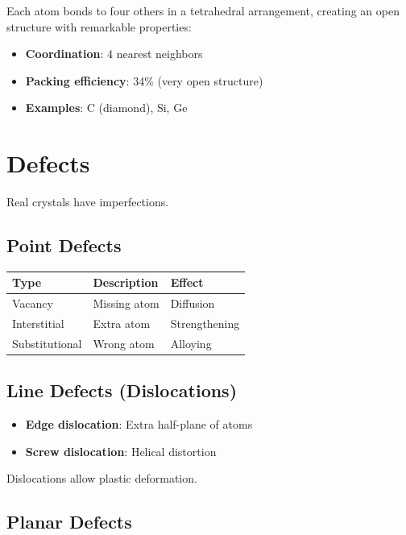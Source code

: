 \documentclass[
  11pt,
  letterpaper,
  twoside,
  openright]{book}
\providecommand{\tightlist}{%
  \setlength{\itemsep}{0pt}\setlength{\parskip}{0pt}}
\begin{document}
Each atom bonds to four others in a tetrahedral arrangement, creating an
open structure with remarkable properties:

\begin{itemize}
\tightlist
\item
  \textbf{Coordination}: 4 nearest neighbors
\item
  \textbf{Packing efficiency}: 34\% (very open structure)
\item
  \textbf{Examples}: C (diamond), Si, Ge
\end{itemize}

\section{Defects}\label{defects}

Real crystals have imperfections.

\subsection{Point Defects}\label{point-defects}

\begin{longtable}[]{@{}lll@{}}
\toprule\noalign{}
Type & Description & Effect \\
\midrule\noalign{}
\endhead
\bottomrule\noalign{}
\endlastfoot
Vacancy & Missing atom & Diffusion \\
Interstitial & Extra atom & Strengthening \\
Substitutional & Wrong atom & Alloying \\
\end{longtable}

\subsection{Line Defects
(Dislocations)}\label{line-defects-dislocations}

\begin{itemize}
\tightlist
\item
  \textbf{Edge dislocation}: Extra half-plane of atoms
\item
  \textbf{Screw dislocation}: Helical distortion
\end{itemize}

Dislocations allow plastic deformation.

\subsection{Planar Defects}\label{planar-defects}
\end{document}
